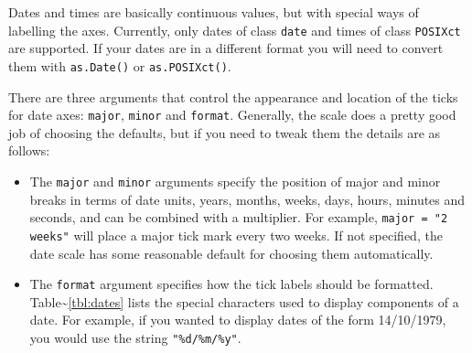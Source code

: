 Dates and times are basically continuous values, but with special ways
of labelling the axes. Currently, only dates of class \texttt{date} and
times of class \texttt{POSIXct} are supported. If your dates are in a
different format you will need to convert them with \texttt{as.Date()}
or \texttt{as.POSIXct()}.  
 

There are three arguments that control the appearance and location of
the ticks for date axes: \texttt{major}, \texttt{minor} and
\texttt{format}. Generally, the scale does a pretty good job of choosing
the defaults, but if you need to tweak them the details are as follows:

\begin{itemize}
\itemsep1pt\parskip0pt
\item
  The \texttt{major} and \texttt{minor} arguments specify the position
  of major and minor breaks in terms of date units, years, months,
  weeks, days, hours, minutes and seconds, and can be combined with a
  multiplier. For example, \texttt{major = "2 weeks"} will place a major
  tick mark every two weeks. If not specified, the date scale has some
  reasonable default for choosing them automatically.
\item
  The \texttt{format} argument specifies how the tick labels should be
  formatted. Table\textasciitilde{}\ref{tbl:dates} lists the special
  characters used to display components of a date. For example, if you
  wanted to display dates of the form 14/10/1979, you would use the
  string \texttt{"\%d/\%m/\%y"}. 
\end{itemize}

